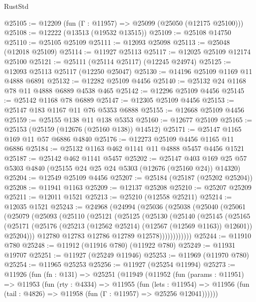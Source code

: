 \begin{lexlean}{RustStd}
\begin{coremodule}
@25105 := @12209 (fun (Γ : @11957) => @25099 (@25050 (@12175 @25100)))
@25108 := @12222 (@13513 (@19532 @13515))
@25109 := @25108 @14750
@25110 := @25105 @25109
@25111 := @12093 @25098
@25113 := @25048 (@12018 @25109)
@25114 := @11927 @25113
@25117 := @12025 @25109 @12174 @25100
@25121 := @25111 (@25114 @25117) (@12245 @24974)
@25125 := @12093 @25113 @25117 (@12250 @25047)
@25130 := @14196 @25109 @1169 @11 @4888 @6891
@25132 := @12282 @25109 @4456
@25140 := @25132 @24 @1168 @78 @11 @4888 @6889 @4538 @465
@25142 := @12296 @25109 @4456
@25145 := @25142 @1168 @78 @6889
@25147 := @12305 @25109 @4456
@25153 := @25147 @183 @1167 @11 @76 @5353 @6888
@25155 := @12668 @25109 @4456
@25159 := @25155 @138 @11 @138 @5353
@25160 := @12677 @25109
@25165 := @25153 (@25159 (@12676 (@25160 @138)) @14512)
@25171 := @25147 @1165 @169 @11 @57 @6886 @4840
@25176 := @12273 @25109 @4456 @1165 @11 @6886
@25184 := @25132 @1163 @462 @1141 @11 @4888 @5457 @4456 @1521
@25187 := @25142 @462 @1141 @5457
@25202 := @25147
    @403
    @169
    @25
    @57
    @5303
    @4840
    (@25155 @24 @25 @24 @5303 (@12676 (@25160 @24)) @14320)
@25204 := @12549 @25109 @4456
@25207 := @25184 (@25187 (@25202 @25204))
@25208 := @11941 @1163
@25209 := @12137 @25208
@25210 := @25207 @25209
@25211 := @12011 @1521
@25213 := @25210 (@12558 @25211)
@25214 := @12035 @1521
@25243 := @24968
    (@24994
      (@25036
        (@25038
          (@25040
            (@25061
              (@25079
                (@25093
                  (@25110
                    (@25121
                      (@25125
                        (@25130
                          (@25140
                            (@25145
                              (@25165
                                (@25171
                                  (@25176 (@25213 (@12562 @25214) (@12567 (@12569 @1163)) @12601))
                                  @25204)))
                            @12780
                            @12783
                            @12786
                            @12789
                            @12578))))))))))))
@25244 := @11910 @780
@25248 := @11912 (@11916 @780) (@11922 @780)
@25249 := @11931 @19707
@25251 := @11927 (@25249 @11946)
@25253 := @11969 (@11970 @780)
@25254 := @11965 @25253
@25256 := @11927 (@25254 @11994)
@25273 := @11926
    (fun (fn : @131) =>
    @25251
      (@11949
        (@11952
          (fun (params : @11951) =>
          @11953
            (fun (rty : @4334) =>
            @11955
              (fun (lets : @11954) =>
              @11956 (fun (tail : @4826) => @11958 (fun (Γ : @11957) => @25256 @12041))))))

\end{coremodule}
\end{lexlean}
